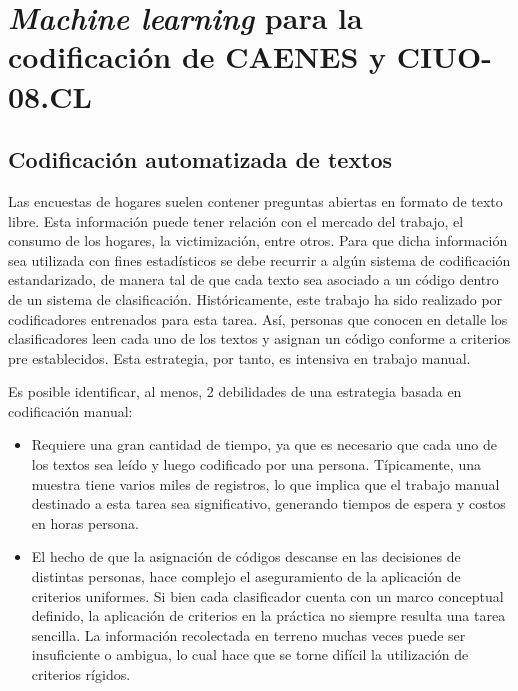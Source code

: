 \documentclass[
  12pt,
  spanish,
]{article}
\begin{document}
\newpage

\hypertarget{machine-learning-para-la-codificaciuxf3n-de-caenes-y-ciuo-08.cl}{%
\section{\texorpdfstring{\emph{Machine learning} para la codificación de
CAENES y
CIUO-08.CL}{Machine learning para la codificación de CAENES y CIUO-08.CL}}\label{machine-learning-para-la-codificaciuxf3n-de-caenes-y-ciuo-08.cl}}

\hypertarget{codificaciuxf3n-automatizada-de-textos}{%
\subsection{Codificación automatizada de
textos}\label{codificaciuxf3n-automatizada-de-textos}}

Las encuestas de hogares suelen contener preguntas abiertas en formato
de texto libre. Esta información puede tener relación con el mercado del
trabajo, el consumo de los hogares, la victimización, entre otros. Para
que dicha información sea utilizada con fines estadísticos se debe
recurrir a algún sistema de codificación estandarizado, de manera tal de
que cada texto sea asociado a un código dentro de un sistema de
clasificación. Históricamente, este trabajo ha sido realizado por
codificadores entrenados para esta tarea. Así, personas que conocen en
detalle los clasificadores leen cada uno de los textos y asignan un
código conforme a criterios pre establecidos. Esta estrategia, por
tanto, es intensiva en trabajo manual.

Es posible identificar, al menos, 2 debilidades de una estrategia basada
en codificación manual:

\begin{itemize}
\item
  Requiere una gran cantidad de tiempo, ya que es necesario que cada uno
  de los textos sea leído y luego codificado por una persona.
  Típicamente, una muestra tiene varios miles de registros, lo que
  implica que el trabajo manual destinado a esta tarea sea
  significativo, generando tiempos de espera y costos en horas persona.
\item
  El hecho de que la asignación de códigos descanse en las decisiones de
  distintas personas, hace complejo el aseguramiento de la aplicación de
  criterios uniformes. Si bien cada clasificador cuenta con un marco
  conceptual definido, la aplicación de criterios en la práctica no
  siempre resulta una tarea sencilla. La información recolectada en
  terreno muchas veces puede ser insuficiente o ambigua, lo cual hace
  que se torne difícil la utilización de criterios rígidos.
\end{itemize}
\end{document}
